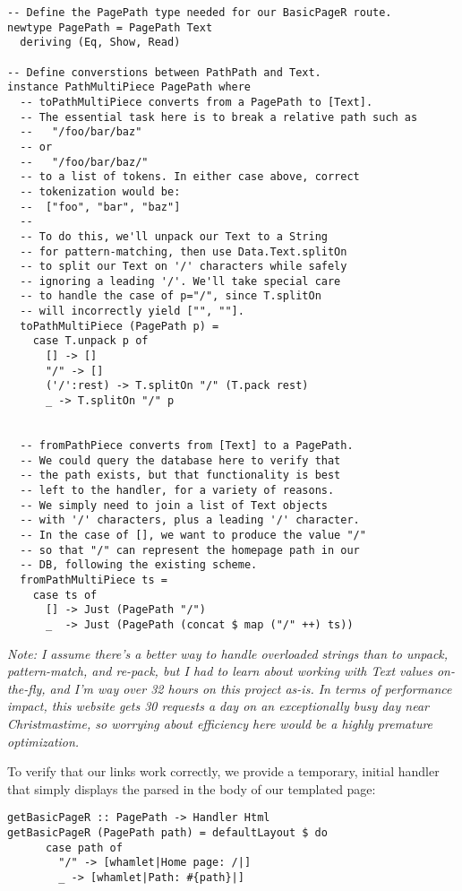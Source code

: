\begin{Verbatim}
-- Define the PagePath type needed for our BasicPageR route.
newtype PagePath = PagePath Text
  deriving (Eq, Show, Read)

-- Define converstions between PathPath and Text.
instance PathMultiPiece PagePath where
  -- toPathMultiPiece converts from a PagePath to [Text].
  -- The essential task here is to break a relative path such as
  --   "/foo/bar/baz"
  -- or
  --   "/foo/bar/baz/"
  -- to a list of tokens. In either case above, correct
  -- tokenization would be:
  --  ["foo", "bar", "baz"]
  --
  -- To do this, we'll unpack our Text to a String
  -- for pattern-matching, then use Data.Text.splitOn 
  -- to split our Text on '/' characters while safely
  -- ignoring a leading '/'. We'll take special care
  -- to handle the case of p="/", since T.splitOn
  -- will incorrectly yield ["", ""].
  toPathMultiPiece (PagePath p) = 
    case T.unpack p of
      [] -> []
      "/" -> []
      ('/':rest) -> T.splitOn "/" (T.pack rest)
      _ -> T.splitOn "/" p
        

  -- fromPathPiece converts from [Text] to a PagePath.
  -- We could query the database here to verify that
  -- the path exists, but that functionality is best
  -- left to the handler, for a variety of reasons.
  -- We simply need to join a list of Text objects
  -- with '/' characters, plus a leading '/' character.
  -- In the case of [], we want to produce the value "/"
  -- so that "/" can represent the homepage path in our
  -- DB, following the existing scheme.
  fromPathMultiPiece ts =
    case ts of
      [] -> Just (PagePath "/")
      _  -> Just (PagePath (concat $ map ("/" ++) ts))
\end{Verbatim}

\emph{Note: I assume there's a better way to handle overloaded strings than to unpack, pattern-match, and re-pack, but I had to learn about working with Text values on-the-fly, and I'm way over 32 hours on this project as-is. In terms of performance impact, this website gets 30 requests a day on an exceptionally busy day near Christmastime, so worrying about efficiency here would be a highly premature optimization.}

To verify that our links work correctly, we provide a temporary, initial handler that simply displays the parsed  in the body of our templated page:

\begin{Verbatim}
getBasicPageR :: PagePath -> Handler Html
getBasicPageR (PagePath path) = defaultLayout $ do
      case path of
        "/" -> [whamlet|Home page: /|]
        _ -> [whamlet|Path: #{path}|]
\end{Verbatim}

